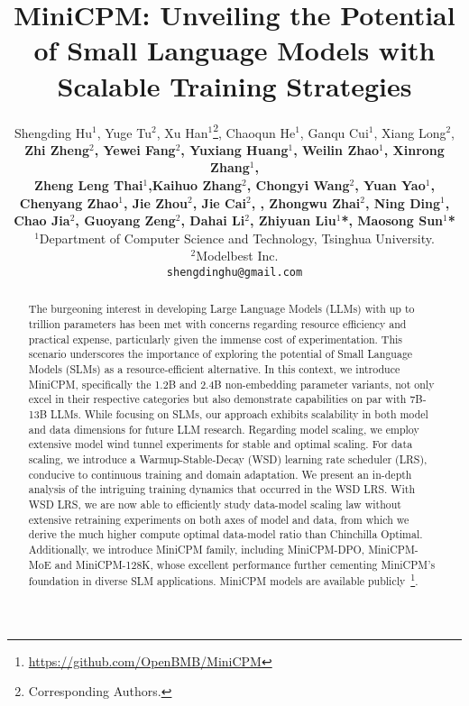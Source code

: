 \documentclass[dvipsnames]{article} %
\title{MiniCPM: Unveiling the Potential of Small Language Models with Scalable Training Strategies}
\author{Shengding Hu$^1$, Yuge Tu$^2$, Xu Han$^1$\thanks{Corresponding Authors.}, Chaoqun He$^1$, Ganqu Cui$^1$, Xiang Long$^2$,\\ \textbf{Zhi Zheng$^2$, Yewei Fang$^2$, Yuxiang Huang$^1$, Weilin Zhao$^1$, Xinrong Zhang$^1$,   } \\ \textbf{Zheng Leng Thai$^1$,Kaihuo Zhang$^2$, Chongyi Wang$^2$, Yuan Yao$^1$, } \\\textbf{ Chenyang Zhao$^1$, Jie Zhou$^2$, Jie Cai$^2$, , Zhongwu Zhai$^2$, Ning Ding$^1$, } \\\textbf{Chao Jia$^2$, Guoyang Zeng$^2$, Dahai Li$^2$, Zhiyuan Liu$^1$*, Maosong Sun$^1$*} \\
$^1$Department of Computer Science and Technology, Tsinghua University. \quad 
\\ 
$^2$Modelbest Inc.\\
\texttt{shengdinghu@gmail.com}
}
\begin{document}
\maketitle
\begin{abstract}
The burgeoning interest in developing Large Language Models (LLMs) with up to trillion parameters has been met with concerns regarding resource efficiency and practical expense, particularly given the immense cost of experimentation. This scenario underscores the importance of exploring the potential of Small Language Models (SLMs) as a resource-efficient alternative. In this context, we introduce MiniCPM, specifically the 1.2B and 2.4B non-embedding parameter variants, not only excel in their respective categories but also demonstrate capabilities on par with 7B-13B LLMs. While focusing on SLMs, our approach exhibits scalability in both model and data dimensions for future LLM research. Regarding model scaling, we employ extensive model wind tunnel experiments for stable and optimal scaling. For data scaling, we introduce a Warmup-Stable-Decay (WSD) learning rate scheduler (LRS), conducive to continuous training and domain adaptation. We present an in-depth analysis of the intriguing training dynamics that occurred in the WSD LRS. With WSD LRS, we are now able to efficiently study data-model scaling law without extensive retraining experiments on both axes of model and data, from which we derive the much higher compute optimal data-model ratio than Chinchilla Optimal. Additionally, we introduce MiniCPM family, including MiniCPM-DPO, MiniCPM-MoE and MiniCPM-128K, whose excellent performance further cementing MiniCPM's foundation in diverse SLM applications. MiniCPM models are available publicly~\footnote{\url{https://github.com/OpenBMB/MiniCPM}}.

\end{abstract}













\newpage
% 



\newpage

\appendix


% 

% 
% 

% 

\end{document}
